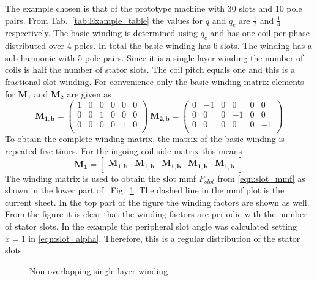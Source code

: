 The example chosen is that of the prototype machine with 30 slots and 10 pole pairs. 
From Tab.~\ref{tab:Example_table} the values for $q$ and $q_c$ are $\frac{1}{2}$ and $\frac{1}{4}$ respectively. The basic winding is determined using $q_c$ and has one  coil per phase distributed over 4 poles. In total the basic winding has 6 slots. The winding has a sub-harmonic with 5 pole pairs. Since it is a single layer winding the number of coils is half the number of stator slots. The coil pitch equals one and this is a fractional slot winding. For convenience only the basic winding matrix elements for $\mathbf{M_1}$ and $\mathbf{M_2}$ are given as
\begin{equation}
  \mathbf{M_{1,b}} = 
  \begin{pmatrix}
  1&0&0&0&0&0\\
  0&0&1&0&0&0\\
  0&0&0&0&1&0\\
  \end{pmatrix} \
  \mathbf{M_{2,b}} = 
  \begin{pmatrix}
  0&-1&0&0 &0&0 \\
  0&0 &0&-1&0&0 \\
  0&0 &0&0 &0&-1\\
  \end{pmatrix} 
\end{equation}
To obtain the complete winding matrix, the matrix of the basic winding is repeated five times. For the ingoing coil side matrix this means
\begin{equation}
  \mathbf{M_1} = 
  \begin{bmatrix}
  \mathbf{M_{1,b}}&\mathbf{M_{1,b}}&\mathbf{M_{1,b}}&
  \mathbf{M_{1,b}}&\mathbf{M_{1,b}}
  \end{bmatrix}  
\end{equation}
The winding matrix is used to obtain the slot mmf $F_{slot}$ from \eqref{eqn:slot_mmf} as shown in the lower part of~%
Fig.~\ref{fig:Main_non-overlapping_single}\subref{fig:f_Qs30_p10_1}. The dashed line in the mmf plot is the current sheet. In the top part of the figure the winding factors are shown as well. From the figure it is clear that the winding factors are periodic with the number of stator slots. In the example the peripheral slot angle was calculated setting $x=1$ in \eqref{eqn:slot_alpha}. Therefore, this is a regular distribution of the stator slots.
\begin{figure}[htbp]
	\centering
	
	\vspace{1cm}
	
	\caption{Non-overlapping single layer winding}
	\label{fig:Main_non-overlapping_single}
\end{figure}

